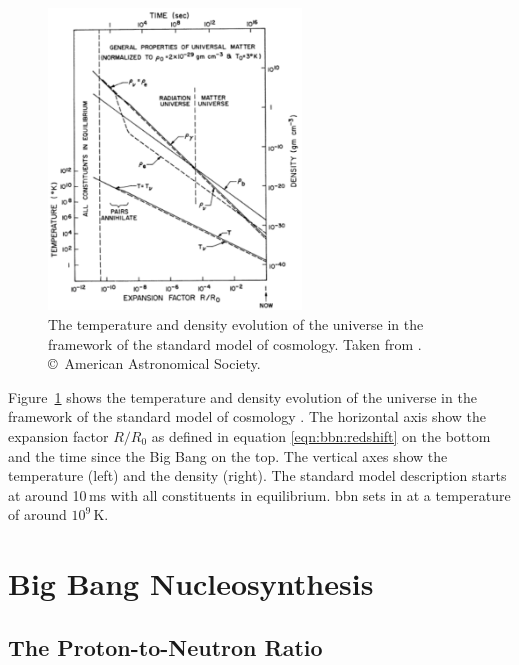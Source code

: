\begin{figure}[tb]
    \centering
    \includegraphics[width=0.6\textwidth]{graphics/bbn/wagoner67_fig1}
    \caption{The temperature and density evolution of the universe in the framework of the standard model of cosmology. Taken from \citet{wagoner67}. \copyright\ American Astronomical Society.}
    \label{fig:bbn:cosmology_phases}
\end{figure}
Figure~\ref{fig:bbn:cosmology_phases} shows the temperature and density evolution of the universe in the framework of the standard model of cosmology \citep{wagoner67}. The horizontal axis show the expansion factor $R/R_0$ as defined in equation \ref{eqn:bbn:redshift} on the bottom and the time since the Big Bang on the top. The vertical axes show the temperature (left) and the density (right). The standard model description starts at around 10\,ms with all constituents in equilibrium. \acl{bbn} sets in at a temperature of around $10^{9}$\,K. 



\section{Big Bang Nucleosynthesis}

\subsection{The Proton-to-Neutron Ratio}

